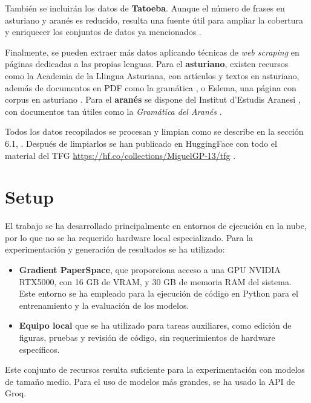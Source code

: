 También se incluirán los datos de \textbf{Tatoeba}. Aunque el número de frases en asturiano y aranés es reducido, resulta una fuente útil para ampliar la cobertura y enriquecer los conjuntos de datos ya mencionados \cite{Tatoeba2025}.

Finalmente, se pueden extraer más datos aplicando técnicas de \textit{web scraping} en páginas dedicadas a las propias lenguas. Para el \textbf{asturiano}, existen recursos como la Academia de la Llingua Asturiana, con artículos y textos en asturiano, además de documentos en PDF como la gramática \cite{ALLA2024}, o Eslema, una página con corpus en asturiano \cite{Viejo2008}. Para el \textbf{aranés} se dispone del Institut d'Estudis Aranesi \cite{InstitutEstudisAranesi2014}, con documentos tan útiles como la \textit{Gramática del Aranés} \cite{GramaticaAranes2021}.

Todos los datos recopilados se procesan y limpian como se describe en la sección 6.1, . Después de limpiarlos se han publicado en HuggingFace con todo el material del TFG \url{https://hf.co/collections/MiguelGP-13/tfg} \cite{lexicons_2025, galician_instructive_2025, asturian_instructive_2025, aranes_instructive_2025, asturian_annotated_2025, galician_annotated_2025, aranes_annotated_2025, asturian_cloze_2025, galician_cloze_2025, aranes_cloze_2025}.


\section{Setup}

El trabajo se ha desarrollado principalmente en entornos de ejecución en la nube, por lo que no se ha requerido hardware local especializado. Para la experimentación y generación de resultados se ha utilizado:

\begin{itemize}
    \item \textbf{Gradient PaperSpace}, que proporciona acceso a una GPU NVIDIA RTX5000, con 16 GB de VRAM, y 30 GB de memoria RAM del sistema. Este entorno se ha empleado para la ejecución de código en Python para el entrenamiento y la evaluación de los modelos.
    \item \textbf{Equipo local} que se ha utilizado para tareas auxiliares, como edición de figuras, pruebas y revisión de código, sin requerimientos de hardware específicos.
\end{itemize}

Este conjunto de recursos resulta suficiente para la experimentación con modelos de tamaño medio. Para el uso de modelos más grandes, se ha usado la API de Groq.

